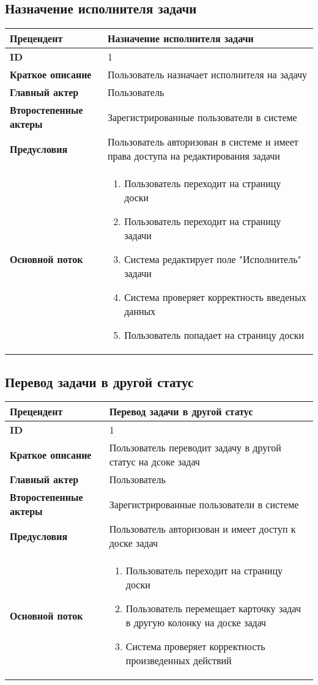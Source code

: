 \documentclass{article}
\begin{document}
\subsection{Назначение исполнителя задачи}

\begin{tabular}{|l|p{9cm}|}
  \hline
  \textbf{Прецендент} & Назначение исполнителя задачи \\
  \hline
  \textbf{ID} & 1 \\
  \hline
  \textbf{Краткое описание} & Пользователь назначает исполнителя на задачу \\
  \hline
  \textbf{Главный актер} & Пользователь\\
  \hline
  \textbf{Второстепенные актеры} & Зарегистрированные пользователи в системе \\
  \hline
  \textbf{Предусловия} &  Пользователь авторизован в системе и имеет права доступа на редактирования задачи\\
  \hline
  \textbf{Основной поток} & \begin{enumerate}
    \item Пользователь переходит на страницу доски
    \item Пользователь переходит на страницу задачи
    \item Система редактирует поле "Исполнитель" задачи
    \item Система проверяет корректность введеных данных
    \item Пользователь попадает на страницу доски
  \end{enumerate} \\
  \hline
\end{tabular}

\subsection{Перевод задачи в другой статус}

\begin{tabular}{|l|p{9cm}|}
  \hline
  \textbf{Прецендент} & Перевод задачи в другой статус \\
  \hline
  \textbf{ID} & 1 \\
  \hline
  \textbf{Краткое описание} & Пользователь переводит задачу в другой статус на дсоке задач \\
  \hline
  \textbf{Главный актер} & Пользователь\\
  \hline
  \textbf{Второстепенные актеры} & Зарегистрированные пользователи в системе \\
  \hline
  \textbf{Предусловия} &  Пользователь авторизован и имеет доступ к доске задач\\
  \hline
  \textbf{Основной поток} & \begin{enumerate}
    \item Пользователь переходит на страницу доски
    \item Пользователь перемещает карточку задач в другую колонку на доске задач
    \item Система проверяет корректность произведенных действий
  \end{enumerate} \\
  \hline
\end{tabular}


\printnoidxglossaries
\end{document}

